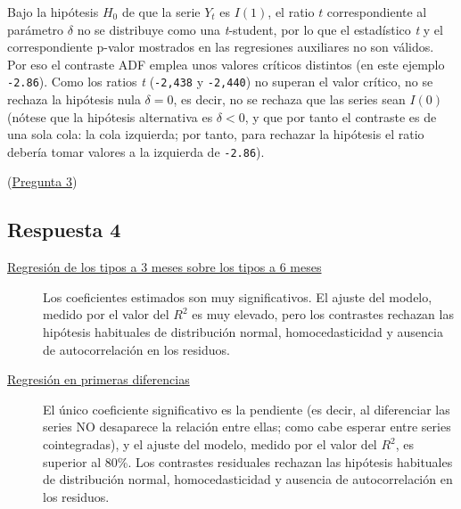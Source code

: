 \documentclass[10pt]{article}
\begin{document}
Bajo la hipótesis \(H_0\) de que la serie \(Y_t\) es \(I(1)\), el ratio \(t\)
correspondiente al parámetro \(\delta\) no se distribuye como una
\emph{t}-student, por lo que el estadístico \emph{t} y el correspondiente
p-valor mostrados en las regresiones auxiliares no son válidos. Por
eso el contraste ADF emplea unos valores críticos distintos (en este
ejemplo \texttt{-2.86}). Como los ratios \emph{t} (\texttt{-2,438} y \texttt{-2,440}) no superan
el valor crítico, no se rechaza la hipótesis nula \(\delta=0\), es
decir, no se rechaza que las series sean \(I(0)\) (nótese que la
hipótesis alternativa es \(\delta<0\), y que por tanto el contraste es
de una sola cola: la cola izquierda; por tanto, para rechazar la
hipótesis el ratio debería tomar valores a la izquierda de \texttt{-2.86}).

(\hyperref[sec:org107e533]{Pregunta 3})
\subsection*{Respuesta 4}
\label{sec:org044d4ea}

\begin{description}
\item[{\hyperref[sec:org0c4e31d]{Regresión de los tipos a 3 meses sobre los tipos a 6 meses}}] Los
coeficientes estimados son muy significativos. El ajuste del modelo,
medido por el valor del \(R^2\) es muy elevado, pero los contrastes
rechazan las hipótesis habituales de distribución normal,
homocedasticidad y ausencia de autocorrelación en los residuos.

\item[{\hyperref[sec:orgaad9f0b]{Regresión en primeras diferencias}}] El único coeficiente
significativo es la pendiente (es decir, al diferenciar las series
NO desaparece la relación entre ellas; como cabe esperar entre
series cointegradas), y el ajuste del modelo, medido por el valor
del \(R^2\), es superior al 80\%. Los contrastes residuales rechazan
las hipótesis habituales de distribución normal, homocedasticidad y
ausencia de autocorrelación en los residuos.
\end{description}
\end{document}
